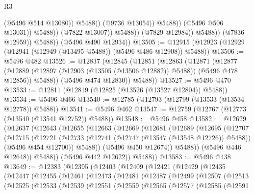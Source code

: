 \begin{lexlean}{R3}
\begin{coremodule}
                                          (@5496 @514 @13080))
                                        @5488))
                                    (@9736 @13054))
                                  @5488))
                              (@5496 @506 @13031))
                            @5488))
                        (@7822 @13007))
                      @5488))
                  (@7829 @12984))
                @5488))
            (@7836 @12959))
          @5488))
      (@5496 @490 @12934))
@13505 := @12915 (@12923 (@12929 (@12941 (@12949 (@13495 @5488)) (@5496 @486 @12908)) @5488))
@13506 := @5496 @482
@13526 := @12837
    (@12845
      (@12851
        (@12863
          (@12871
            (@12877
              (@12889 (@12897 (@12903 (@13505 (@13506 @12882)) @5488)) (@5496 @478 @12856))
              @5488))
          (@5496 @474 @12830))
        @5488))
@13527 := @5496 @470
@13533 := @12811 (@12819 (@12825 (@13526 (@13527 @12804)) @5488))
@13534 := @5496 @466
@13540 := @12785 (@12793 (@12799 (@13533 (@13534 @12778)) @5488))
@13541 := @5496 @462
@13547 := @12759 (@12767 (@12773 (@13540 (@13541 @12752)) @5488))
@13548 := @5496 @458
@13582 := @12629
    (@12637
      (@12643
        (@12655
          (@12663
            (@12669
              (@12681
                (@12689
                  (@12695
                    (@12707
                      (@12715
                        (@12721
                          (@12733
                            (@12741 (@12747 (@13547 (@13548 @12726)) @5488))
                            (@5496 @454 @12700))
                          @5488))
                      (@5496 @450 @12674))
                    @5488))
                (@5496 @446 @12648))
              @5488))
          (@5496 @442 @12622))
        @5488))
@13583 := @5496 @438
@13649 := @12383
    (@12395
      (@12403
        (@12409
          (@12421
            (@12429
              (@12435
                (@12447
                  (@12455
                    (@12461
                      (@12473
                        (@12481
                          (@12487
                            (@12499
                              (@12507
                                (@12513
                                  (@12525
                                    (@12533
                                      (@12539
                                        (@12551
                                          (@12559
                                            (@12565
                                              (@12577
                                                (@12585
                                                  (@12591

\end{coremodule}
\end{lexlean}
